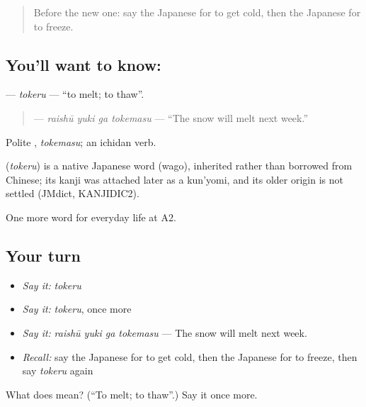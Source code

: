 \label{lesson:JA-C212-tokeru}



\begin{quote}
Before the new one: say the Japanese for to get cold, then the Japanese for to freeze.
\end{quote}

\subsection*{You'll want to know: }
\textbf{} — \emph{tokeru} — \textquotedblleft{}to melt; to thaw\textquotedblright{}.

\begin{quote}
\textbf{  } — \emph{raishū yuki ga tokemasu} — \textquotedblleft{}The snow will melt next week.\textquotedblright{}
\end{quote}

Polite \textbf{}, \emph{tokemasu}; an ichidan verb.

\begin{cousinweb}
\textbf{} (\emph{tokeru}) is a native Japanese word (wago), inherited rather than borrowed from Chinese; its kanji was attached later as a kun'yomi, and its older origin is not settled (JMdict, KANJIDIC2).
\end{cousinweb}

\begin{grammarlens}[title={What you've built}]
One more word for everyday life at A2.
\end{grammarlens}

\subsection*{Your turn}
\begin{itemize}
\raggedright
  \item \emph{Say it:} \emph{tokeru}
  \item \emph{Say it:} \emph{tokeru}, once more
  \item \emph{Say it:} \emph{raishū yuki ga tokemasu} — The snow will melt next week.
  \item \emph{Recall:} say the Japanese for to get cold, then the Japanese for to freeze, then say \emph{tokeru} again
\end{itemize}

\begin{tcolorbox}[breakable,colback=teal!4,colframe=teal!35!black,title={Before you move on}]
What does  mean? (\textquotedblleft{}To melt; to thaw\textquotedblright{}.) Say it once more.
\end{tcolorbox}
